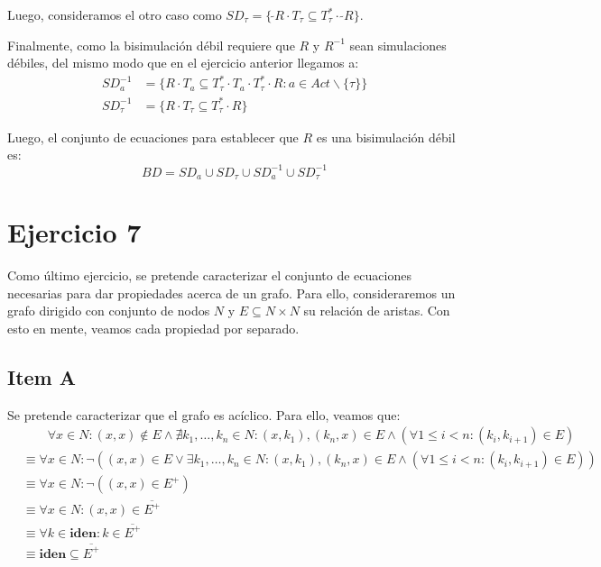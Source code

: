 \documentclass{article}
\newcommand{\iden}{\textbf{iden}}
\newcommand{\conv}[1]{\ \tilde{}#1}
\begin{document}
Luego, consideramos el otro caso como $SD_\tau = \{\conv{R} \cdot T_\tau \subseteq T_\tau^* \cdot \conv{R}\}$.

Finalmente, como la bisimulación débil requiere que $R$ y $R^{-1}$ sean simulaciones débiles, del mismo modo que en el ejercicio anterior llegamos a:
\begin{equation*}
  \begin{aligned}
    SD_a^{-1} &= \{R \cdot T_a \subseteq T_\tau^* \cdot T_a \cdot T_\tau^* \cdot R : a \in Act \smallsetminus \{\tau\}\} \\ 
    SD_\tau^{-1} &= \{R \cdot T_\tau \subseteq T_\tau^* \cdot R\}
  \end{aligned}
\end{equation*}

Luego, el conjunto de ecuaciones para establecer que $R$ es una bisimulación débil es:
\begin{equation*}
  BD = SD_a \cup SD_\tau \cup SD^{-1}_a \cup SD^{-1}_\tau
\end{equation*}

\section*{Ejercicio 7}
Como último ejercicio, se pretende caracterizar el conjunto de ecuaciones necesarias para dar propiedades acerca de un grafo.
Para ello, consideraremos un grafo dirigido con conjunto de nodos $N$ y $E \subseteq N \times N$ su relación de aristas.
Con esto en mente, veamos cada propiedad por separado.

\subsection*{Item A}
Se pretende caracterizar que el grafo es acíclico.
Para ello, veamos que:
\begin{equation*}
  \begin{aligned}
    &\qquad \forall x \in N : (x, x) \notin E \land \nexists k_1, \dots, k_n \in N : (x, k_1), (k_n, x) \in E \land (\forall 1 \leq i < n : (k_i, k_{i+1}) \in E) \\ 
    &\equiv \forall x \in N : \neg((x, x) \in E \lor \exists k_1, \dots, k_n \in N : (x, k_1), (k_n, x) \in E \land (\forall 1 \leq i < n : (k_i, k_{i+1}) \in E)) \\ 
    &\equiv \forall x \in N : \neg((x, x) \in E^+) \\ 
    &\equiv \forall x \in N : (x, x) \in \overline{E^+} \\ 
    &\equiv \forall k \in \iden : k \in \overline{E^+} \\ 
    &\equiv \iden \subseteq \overline{E^+}
  \end{aligned}
\end{equation*}
\end{document}
